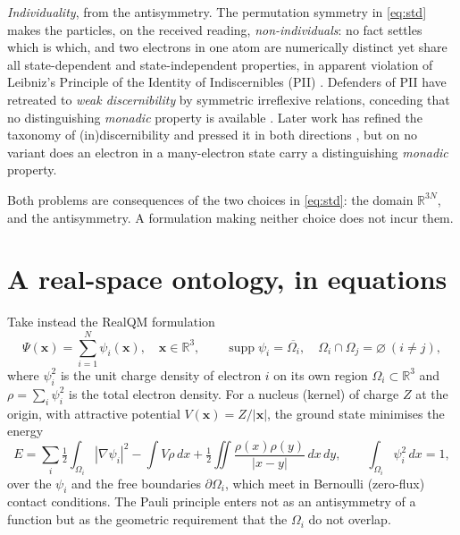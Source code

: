 \documentclass[11pt]{article}
\begin{document}
\emph{Individuality}, from the antisymmetry. The permutation symmetry in \eqref{eq:std} makes the
particles, on the received reading, \emph{non-individuals}: no fact settles which is which, and two
electrons in one atom are numerically distinct yet share all state-dependent and state-independent
properties, in apparent violation of Leibniz's Principle of the Identity of Indiscernibles (PII)
\cite{FrenchKrause2006,FrenchSEP}. Defenders of PII have retreated to \emph{weak discernibility} by
symmetric irreflexive relations, conceding that no distinguishing \emph{monadic} property is available
\cite{Saunders2006,MullerSaunders2008}. Later work has refined the taxonomy of (in)discernibility and
pressed it in both directions \cite{MullerSeevinck2009,CaultonButterfield2012}, but on no variant does an
electron in a many-electron state carry a distinguishing \emph{monadic} property.

Both problems are consequences of the two choices in \eqref{eq:std}: the domain $\mathbb R^{3N}$, and the
antisymmetry. A formulation making neither choice does not incur them.

\section{A real-space ontology, in equations}
\label{sec:po}

Take instead the RealQM formulation \cite{RealQM}
\begin{equation}
\Psi(\mathbf x)=\sum_{i=1}^N\psi_i(\mathbf x),\quad \mathbf x\in\mathbb R^3,\qquad
\operatorname{supp}\psi_i=\overline{\Omega_i},\quad \Omega_i\cap\Omega_j=\varnothing\ (i\neq j),
\label{eq:real}
\end{equation}
where $\psi_i^2$ is the unit charge density of electron $i$ on its own region $\Omega_i\subset\mathbb R^3$
and $\rho=\sum_i\psi_i^2$ is the total electron density. For a nucleus (kernel) of charge $Z$ at the
origin, with attractive potential $V(\mathbf x)=Z/|\mathbf x|$, the ground state minimises the energy
\begin{equation}
E=\sum_i\tfrac12\!\int_{\Omega_i}|\nabla\psi_i|^2
-\int V\rho\,dx
+\tfrac12\!\iint\frac{\rho(x)\rho(y)}{|x-y|}\,dx\,dy,\qquad
\int_{\Omega_i}\psi_i^2\,dx=1,
\label{eq:E}
\end{equation}
over the $\psi_i$ and the free boundaries $\partial\Omega_i$, which meet in Bernoulli (zero-flux) contact
conditions. The Pauli principle enters not as an antisymmetry of a function but as the geometric
requirement that the $\Omega_i$ do not overlap.
\end{document}
